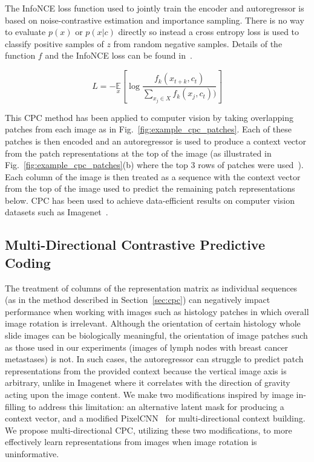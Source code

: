 The InfoNCE loss function used to jointly train the encoder and autoregressor is based on noise-contrastive estimation and importance sampling. There is no way to evaluate \(p(x)\) or \(p(x|c)\) directly so instead a cross entropy loss is used to classify positive samples of \(z\) from random negative samples. Details of the function \(f\) and the InfoNCE loss can be found in~\cite{oord2018representation}.

\begin{equation}
	L=-\underset{x}{\mathbb{E}}\left[\log\frac{f_k(x_{t+k},c_t)}{\sum_{x_j\in X}f_k(x_j,c_t))}\right]
	\label{eq:InfoNCE}
\end{equation} 

This CPC method has been applied to computer vision by taking overlapping patches from each image as in Fig.~\ref{fig:example_cpc_patches}. Each of these patches is then encoded and an autoregressor is used to produce a context vector from the patch representations at the top of the image (as illustrated in Fig.~\ref{fig:example_cpc_patches}(b) where the top 3 rows of patches were used~\cite{oord2018representation}). Each column of the image is then treated as a sequence with the context vector from the top of the image used to predict the remaining patch representations below. CPC has been used to achieve data-efficient results on computer vision datasets such as Imagenet~\cite{deng2009imagenet}.

\subsection{Multi-Directional Contrastive Predictive Coding}
\label{subsec:unsupervised_mlcpc}
The treatment of columns of the representation matrix as individual sequences (as in the method described in Section~\ref{sec:cpc}) can negatively impact performance when working with images such as histology patches in which overall image rotation is irrelevant. Although the orientation of certain histology whole slide images can be biologically meaningful, the orientation of image patches such as those used in our experiments (images of lymph nodes with breast cancer metastases) is not. In such cases, the autoregressor can struggle to predict patch representations from the provided context because the vertical image axis is arbitrary, unlike in Imagenet where it correlates with the direction of gravity acting upon the image content. We make two modifications inspired by image in-filling to address this limitation: an alternative latent mask for producing a context vector, and a modified PixelCNN~\cite{oord2016pixel} for multi-directional context building. We propose multi-directional CPC, utilizing these two modifications, to more effectively learn representations from images when image rotation is uninformative.

